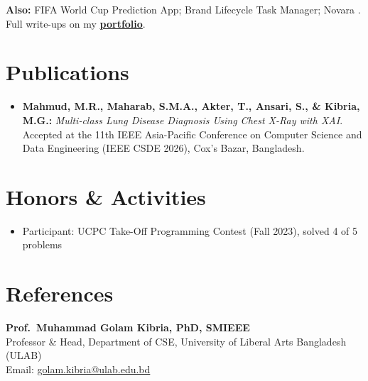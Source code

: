 \documentclass[letterpaper,11pt]{article}
\begin{document}
\vspace{3pt}
\textbf{Also:} FIFA World Cup Prediction App; Brand Lifecycle Task Manager; Novara . Full write-ups on my \href{https://rifat-mah-mud.github.io/PortFolio/}{\textbf{portfolio}}.

\section{Publications}
\begin{itemize}[itemsep=3pt]
    \item \textbf{Mahmud, M.R., Maharab, S.M.A., Akter, T., Ansari, S., \& Kibria, M.G.:} \textit{Multi-class Lung Disease Diagnosis Using Chest X-Ray with XAI}. Accepted at the 11th IEEE Asia-Pacific Conference on Computer Science and Data Engineering (IEEE CSDE 2026), Cox's Bazar, Bangladesh.
\end{itemize}

\section{Honors \& Activities}
\begin{itemize}
    \item Participant: UCPC Take-Off Programming Contest (Fall 2023), solved 4 of 5 problems
\end{itemize}

\section{References}
\textbf{Prof.\ Muhammad Golam Kibria, PhD, SMIEEE} \\
Professor \& Head, Department of CSE, University of Liberal Arts Bangladesh (ULAB) \\
Email: \href{mailto:golam.kibria@ulab.edu.bd}{golam.kibria@ulab.edu.bd}
\end{document}
